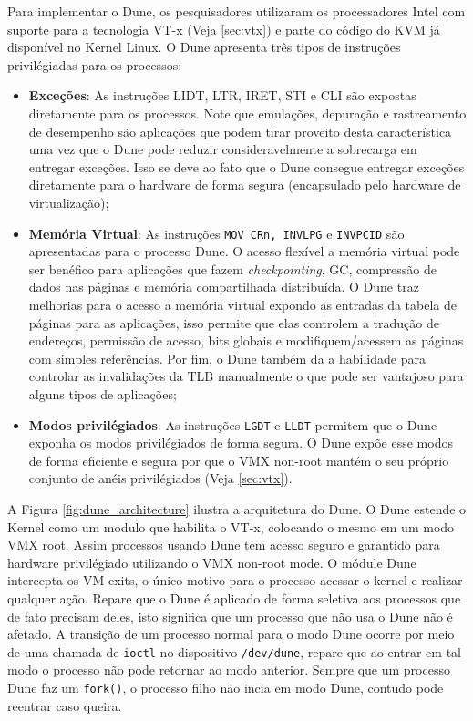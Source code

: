 Para implementar o Dune, os pesquisadores utilizaram os processadores Intel com
suporte para a tecnologia VT-x (Veja \ref{sec:vtx}) e parte do código do KVM já
disponível no Kernel Linux. O Dune apresenta três tipos de instruções
privilégiadas para os processos:

\begin{itemize}
  \item \textbf{Exceções}:  As instruções LIDT, LTR, IRET, STI e CLI são
        expostas diretamente para os processos. Note que emulações, depuração e
        rastreamento de desempenho são aplicações que podem tirar proveito
        desta característica uma vez que o Dune pode reduzir consideravelmente
        a sobrecarga em entregar exceções. Isso se deve ao fato que o Dune
        consegue entregar exceções diretamente para o hardware de forma segura
        (encapsulado pelo hardware de virtualização);
  \item \textbf{Memória Virtual}: As instruções \texttt{MOV CRn, INVLPG} e
        \texttt{INVPCID} são apresentadas para o processo Dune. O acesso
        flexível a memória virtual pode ser benéfico para aplicações que fazem
        \emph{checkpointing}, GC, compressão de dados nas páginas e memória
        compartilhada distribuída. O Dune traz melhorias para o acesso a
        memória virtual expondo as entradas da tabela de páginas para as
        aplicações, isso permite que elas controlem a tradução de endereços,
        permissão de acesso, bits globais e modifiquem/acessem as páginas com
        simples referências. Por fim, o Dune também da a habilidade para
        controlar as invalidações da TLB manualmente o que pode ser vantajoso
        para alguns tipos de aplicações;
  \item \textbf{Modos privilégiados}: As instruções \texttt{LGDT} e
        \texttt{LLDT} permitem que o Dune exponha os modos privilégiados de
        forma segura. O Dune expõe esse modos de forma eficiente e segura por
        que o VMX non-root mantém o seu próprio conjunto de anéis privilégiados
        (Veja \ref{sec:vtx}).
\end{itemize}

A Figura \ref{fig:dune_architecture} ilustra a arquitetura do Dune. O Dune
estende o Kernel como um modulo que habilita o VT-x, colocando o mesmo em um
modo VMX root. Assim processos usando Dune tem acesso seguro e garantido para
hardware privilégiado utilizando o VMX non-root mode. O módule Dune intercepta
os VM exits, o único motivo para o processo acessar o kernel e realizar
qualquer ação. Repare que o Dune é aplicado de forma seletiva aos processos que
de fato precisam deles, isto significa que um processo que não usa o Dune não é
afetado. A transição de um processo normal para o modo Dune ocorre por meio de
uma chamada de \texttt{ioctl} no dispositivo \texttt{/dev/dune}, repare que ao
entrar em tal modo o processo não pode retornar ao modo anterior. Sempre que um
processo Dune faz um \texttt{fork()}, o processo filho não incia em modo Dune,
contudo pode reentrar caso queira.

